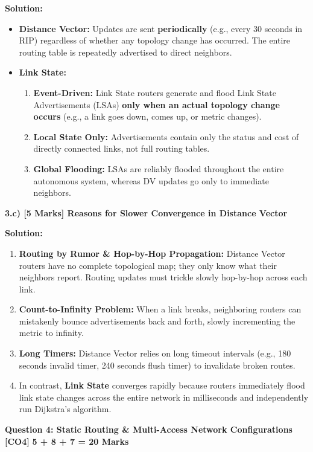 \documentclass[11pt,a4paper]{article}
\newcommand{\questionheader}[3]{
    \vspace{0.35cm}
    \noindent\colorbox{qboxbg}{
        \parbox{\dimexpr\textwidth-2\fboxsep\relax}{
            \textbf{\textcolor{primary}{\large #1}} \hfill \textbf{\textcolor{accent}{[#2]}} \hfill \textbf{\textcolor{secondary}{#3 Marks}}
        }
    }
    \vspace{0.15cm}
}
\begin{document}
\textbf{Solution:}
\begin{itemize}
    \item \textbf{Distance Vector:} Updates are sent \textbf{periodically} (e.g., every 30 seconds in RIP) regardless of whether any topology change has occurred. The entire routing table is repeatedly advertised to direct neighbors.
    \item \textbf{Link State:} 
    \begin{enumerate}
        \item \textbf{Event-Driven:} Link State routers generate and flood Link State Advertisements (LSAs) \textbf{only when an actual topology change occurs} (e.g., a link goes down, comes up, or metric changes).
        \item \textbf{Local State Only:} Advertisements contain only the status and cost of directly connected links, not full routing tables.
        \item \textbf{Global Flooding:} LSAs are reliably flooded throughout the entire autonomous system, whereas DV updates go only to immediate neighbors.
    \end{enumerate}
\end{itemize}

\vspace{0.2cm}
\textbf{3.c) [5 Marks] Reasons for Slower Convergence in Distance Vector}

\textbf{Solution:}
\begin{enumerate}
    \item \textbf{Routing by Rumor \& Hop-by-Hop Propagation:} Distance Vector routers have no complete topological map; they only know what their neighbors report. Routing updates must trickle slowly hop-by-hop across each link.
    \item \textbf{Count-to-Infinity Problem:} When a link breaks, neighboring routers can mistakenly bounce advertisements back and forth, slowly incrementing the metric to infinity.
    \item \textbf{Long Timers:} Distance Vector relies on long timeout intervals (e.g., 180 seconds invalid timer, 240 seconds flush timer) to invalidate broken routes.
    \item In contrast, \textbf{Link State} converges rapidly because routers immediately flood link state changes across the entire network in milliseconds and independently run Dijkstra's algorithm.
\end{enumerate}

\newpage
\questionheader{Question 4: Static Routing \& Multi-Access Network Configurations}{CO4}{5 + 8 + 7 = 20}
\end{document}
